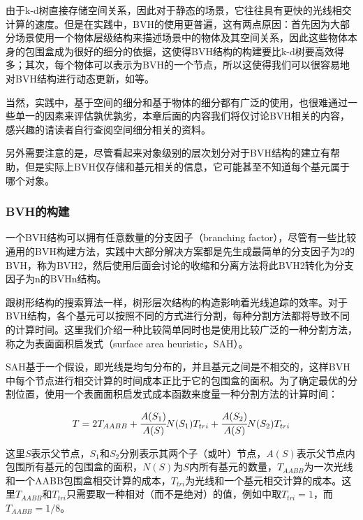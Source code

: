 由于k-d树直接存储空间关系，因此对于静态的场景，它往往具有更快的光线相交计算的速度。但是在实践中，BVH的使用更普遍，这有两点原因：首先因为大部分场景使用一个物体层级结构来描述场景中的物体及其空间关系，因此这些物体本身的包围盒成为很好的细分的依据，这使得BVH结构的构建要比k-d树要高效得多；其次，每个物体可以表示为BVH的一个节点，所以这使得我们可以很容易地对BVH结构进行动态更新，如\cite{a:RayTracingDeformableScenesUsingDynamicBoundingVolumeHierarchies}等。

当然，实践中，基于空间的细分和基于物体的细分都有广泛的使用，也很难通过一些单一的因素来评估孰优孰劣，本章后面的内容我们将仅讨论BVH相关的内容，感兴趣的请读者自行查阅空间细分相关的资料。

另外需要注意的是，尽管看起来对象级别的层次划分对于BVH结构的建立有帮助，但是实际上BVH仅存储和基元相关的信息，它可能甚至不知道每个基元属于哪个对象。








\subsubsection{BVH的构建}
一个BVH结构可以拥有任意数量的分支因子（branching factor），尽管有一些比较通用的BVH构建方法，实践中大部分解决方案都是先生成最简单的分支因子为2的BVH，称为BVH2，然后使用后面会讨论的收缩和分离方法将此BVH2转化为分支因子为n的BVHn结构。

跟树形结构的搜索算法一样，树形层次结构的构造影响着光线追踪的效率。对于BVH结构，各个基元可以按照不同的方式进行分割，每种分割方法都将导致不同的计算时间。这里我们介绍一种比较简单同时也是使用比较广泛的一种分割方法\cite{a:RayTracingDeformableScenesUsingDynamicBoundingVolumeHierarchies}，称之为表面面积启发式（surface area heuristic，SAH）。

SAH基于一个假设，即光线是均匀分布的，并且基元之间是不相交的，这样BVH中每个节点进行相交计算的时间成本正比于它的包围盒的面积。为了确定最优的分割位置，\cite{a:Automaticcreationofobjecthierarchiesforraytracing,a:Heuristicsforraytracingusingspacesubdivision}使用一个表面面积启发式成本函数来度量一种分割方法的计算时间：

\begin{equation}
	T=2T_{AABB}+ \cfrac{A(S_1)}{A(S)}N(S_1)T_{tri}+ \cfrac{A(S_2)}{A(S)}N(S_2)T_{tri}
\end{equation}

\noindent 这里$S$表示父节点，$S_1$和$S_2$分别表示其两个子（或叶）节点，$A(S)$表示父节点内包围所有基元的包围盒的面积，$N(S)$为$S$内所有基元的数量，$T_{AABB}$为一次光线和一个AABB包围盒相交计算的成本，$T_{tri}$为光线和一个基元相交计算的成本。这里$T_{AABB}$和$T_{tri}$只需要取一种相对（而不是绝对）的值，例如\cite{b:pbrt}中取$T_{tri}=1$，而$T_{AABB}=1/8$。

